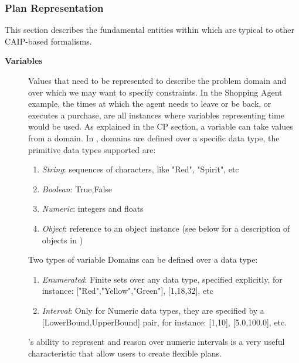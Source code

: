 \subsubsection{\eu Plan Representation}
\label{sec:europa:pr}

This section describes the fundamental entities within \eu which are
typical to other CAIP-based formalisms.

\begin{description}

\item[\textbf{Variables}] Values that need to be represented to
  describe the problem domain and over which we may want to specify
  constraints. In the Shopping Agent example, the times at which the
  agent needs to leave or be back, or executes a purchase, are all
  instances where variables representing time would be used.  As
  explained in the \textsf{CP} section, a variable can take values
  from a domain. In \eu, domains are defined over a specific data
  type, the primitive data types supported are:

  \begin{enumerate}
  \item \textit{String}: sequences of characters, like "Red",
    "Spirit", etc

  \item \textit{Boolean}: {True,False}

  \item \textit{Numeric}: integers and floats

  \item \textit{Object}: reference to an object instance (see below
    for a description of objects in \eu)
  
\end {enumerate}

Two types of variable Domains can be defined over a data type:

  \begin{enumerate}
  \item \textit{Enumerated}: Finite sets over any data type, specified
    explicitly, for instance: ["Red","Yellow","Green"], [1,18,32], etc
  \item \textit{Interval}: Only for Numeric data types, they are
    specified by a [LowerBound,UpperBound] pair, for instance: [1,10],
    [5.0,100.0], etc.
  \end {enumerate}

  \eu's ability to represent and reason over numeric intervals is a
  very useful characteristic that allow users to create flexible
  plans. 


\end{description}

